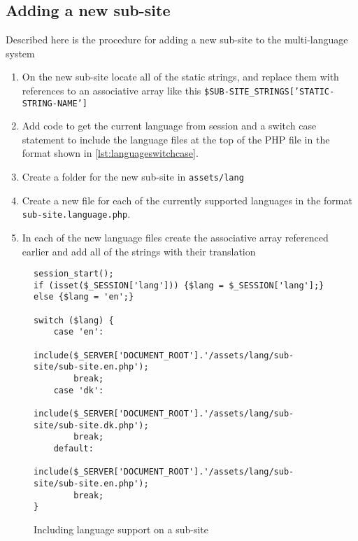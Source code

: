 \subsection{Adding a new sub-site}
Described here is the procedure for adding a new sub-site to the multi-language system
\begin{enumerate}
\item On the new sub-site locate all of the static strings, and replace them with references to an associative array like this \texttt{\$SUB-SITE_STRINGS['STATIC-STRING-NAME']}
\item Add code to get the current language from session and a switch case statement to include the language files at the top of the PHP file in the format shown in \autoref{lst:languageswitchcase}.
\item Create a folder for the new sub-site in \texttt{assets/lang}
\item Create a new file for each of the currently supported languages in the format \texttt{sub-site.language.php}.
\item In each of the new language files create the associative array referenced earlier and add all of the strings with their translation
\end{enumerate}
\begin{figure}[htbp]
\begin{lstlisting}
session_start();
if (isset($_SESSION['lang'])) {$lang = $_SESSION['lang'];} else {$lang = 'en';}

switch ($lang) {
	case 'en':
		include($_SERVER['DOCUMENT_ROOT'].'/assets/lang/sub-site/sub-site.en.php');
		break;
	case 'dk':
		include($_SERVER['DOCUMENT_ROOT'].'/assets/lang/sub-site/sub-site.dk.php');
		break;
	default:
		include($_SERVER['DOCUMENT_ROOT'].'/assets/lang/sub-site/sub-site.en.php');
		break;
}
\end{lstlisting}
\caption{Including language support on a sub-site}
\label{lst:languageswitchcase}
\end{figure}